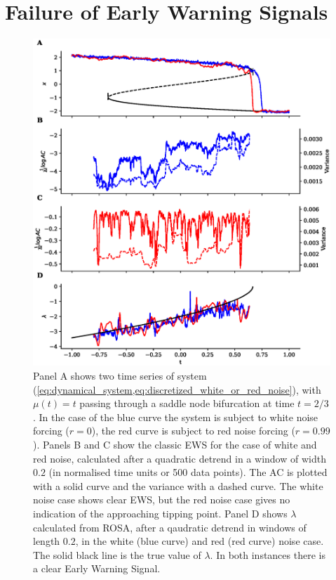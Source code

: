 \section{Failure of Early Warning Signals}\label{sec:failure}
\begin{figure}
\includegraphics[scale=0.7,keepaspectratio]{figure1.eps}
\caption[Early Warning Signals Failing]
{Panel A shows two time series of system (\cref{eq:dynamical_system,eq:discretized_white_or_red_noise}), with $\mu(t)=t$ passing through a saddle node bifurcation at time $t=2/3$. 
  In the case of the blue curve the system
  is subject to white noise forcing ($r=0$), the red curve is subject to 
  red noise forcing ($r=0.99$). Panels B and C show the
  classic EWS for the case of white and
  red noise, calculated after a
  quadratic detrend in a window of width $0.2$ (in normalised time units or 500 data points).
  The AC is plotted with a solid curve and
  the variance with a 
  dashed curve.
  The white noise case shows clear EWS, 
  but the red noise case gives no indication of the approaching tipping point. Panel D shows $\lambda$ calculated from ROSA, after a
  qaudratic detrend in windows of length $0.2$, in the
  white (blue curve) and red (red curve) noise case. The solid black 
  line is the true value of $\lambda$. In both instances there
  is a clear Early Warning Signal.}\label{fig:failure_of_ews}
\end{figure}

